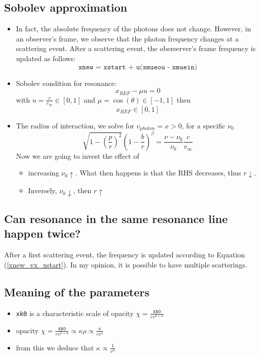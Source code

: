\documentclass[../main/main.tex]{subfiles}
\begin{document}
\subsection{Sobolev approximation}
\begin{itemize}
\item In fact, the absolute frequency of the photons does not change. However, in an observer's frame, we observe that the photon frequency changes at a scattering event. After a scattering event, the oberserver's frame frequency is updated as follows:
\begin{equation}
\texttt{xnew = xstart + u(xmueou - xmuein)}
\label{xnew_vx_xstart}
\end{equation}

\item Sobolev condition for resonance:
\begin{equation}
x_{REF} - \mu u = 0
\end{equation}
with $u = \frac{v}{v_{\infty}} \in [0,1]$ and $\mu = \cos(\theta) \in [-1,1]$ then 
\begin{equation}
x_{REF} \in [0,1]
\end{equation}

\item The radius of interaction, we solve for $v_{photon} = x > 0$, for a specific $\nu_0$
\begin{equation}
\sqrt{1-\left(\frac{p}{r}\right)^2} \left( 1- \frac{b}{r} \right)^{\beta} = \frac{\nu - \nu_0}{\nu_0} \frac{c}{v_{\infty}}
\end{equation}
Now we are going to invest the effect of 
\begin{itemize}
\item increasing $\nu_0 \uparrow$. What then happens is that the RHS decreases, thus $r \downarrow$. 
\item Inversely, $\nu_0 \downarrow$, then $r \uparrow$
\end{itemize}
\end{itemize}


\subsection{Can resonance in the same resonance line happen twice?}
After a first scattering event, the frequency is updated according to Equation (\ref{xnew_vx_xstart}).
In my opinion, it is possible to have multiple scatterings.

\subsection{Meaning of the parameters}
\begin{itemize}
\item \texttt{xk0} is a characteristic scale of opacity $\chi = \frac{\texttt{xk0}}{rv^{2+ \alpha}}$
\item opacity $\chi  = \frac{\texttt{xk0}}{rv^{2+ \alpha}} \propto \kappa \rho \propto \frac{\kappa}{rv^2}$ 
\item from this we deduce that $\kappa \propto  \frac{1}{v^{\alpha}}$
\end{itemize}
\end{document}
